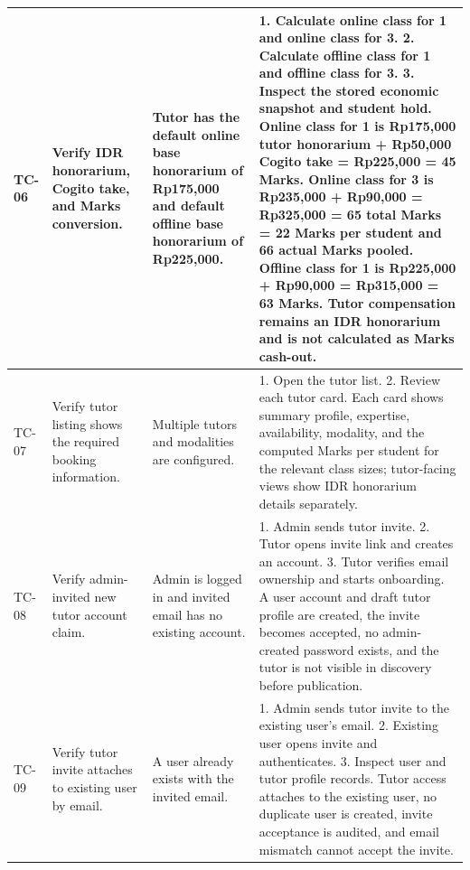 \documentclass[11pt,a4paper]{article}
\begin{document}
\begin{longtable}{|L{1.2cm}|L{3.3cm}|L{3.9cm}|L{6.0cm}|}
	\hline
	TC-06          & Verify IDR honorarium, Cogito take, and Marks conversion.         & Tutor has the default online base honorarium of Rp175,000 and default offline base honorarium of Rp225,000.                                        & 1. Calculate online class for 1 and online class for 3. 2. Calculate offline class for 1 and offline class for 3. 3. Inspect the stored economic snapshot and student hold. \newline Online class for 1 is Rp175,000 tutor honorarium + Rp50,000 Cogito take = Rp225,000 = 45 Marks. Online class for 3 is Rp235,000 + Rp90,000 = Rp325,000 = 65 total Marks = 22 Marks per student and 66 actual Marks pooled. Offline class for 1 is Rp225,000 + Rp90,000 = Rp315,000 = 63 Marks. Tutor compensation remains an IDR honorarium and is not calculated as Marks cash-out.                                                                                                                                                                    \\
	\hline
	TC-07          & Verify tutor listing shows the required booking information.         & Multiple tutors and modalities are configured.                                        & 1. Open the tutor list. 2. Review each tutor card. \newline Each card shows summary profile, expertise, availability, modality, and the computed Marks per student for the relevant class sizes; tutor-facing views show IDR honorarium details separately.                                                                                                                                                                    \\
	\hline
	TC-08          & Verify admin-invited new tutor account claim.                                       & Admin is logged in and invited email has no existing account.              & 1. Admin sends tutor invite. 2. Tutor opens invite link and creates an account. 3. Tutor verifies email ownership and starts onboarding. \newline A user account and draft tutor profile are created, the invite becomes accepted, no admin-created password exists, and the tutor is not visible in discovery before publication.                                                                                                              \\
	\hline
	TC-09          & Verify tutor invite attaches to existing user by email.                             & A user already exists with the invited email.                     & 1. Admin sends tutor invite to the existing user's email. 2. Existing user opens invite and authenticates. 3. Inspect user and tutor profile records. \newline Tutor access attaches to the existing user, no duplicate user is created, invite acceptance is audited, and email mismatch cannot accept the invite.                                                                     \\

\end{longtable}
\end{document}
